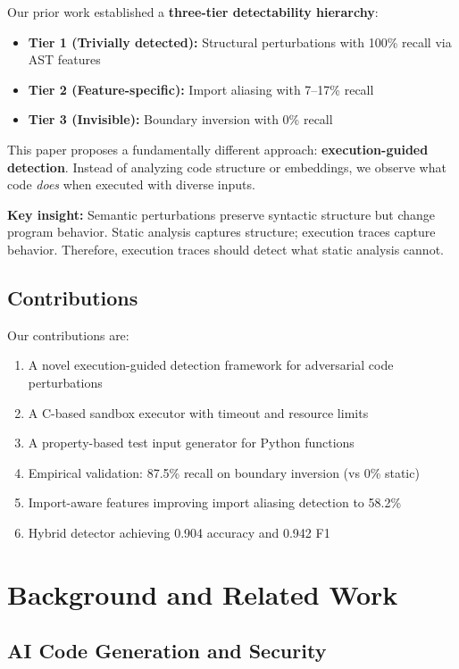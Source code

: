 \documentclass[conference]{IEEEtran}
\begin{document}
Our prior work established a \textbf{three-tier detectability hierarchy}:
\begin{itemize}
    \item \textbf{Tier 1 (Trivially detected):} Structural perturbations with 100\% recall via AST features
    \item \textbf{Tier 2 (Feature-specific):} Import aliasing with 7--17\% recall
    \item \textbf{Tier 3 (Invisible):} Boundary inversion with 0\% recall
\end{itemize}

This paper proposes a fundamentally different approach: \textbf{execution-guided detection}. Instead of analyzing code structure or embeddings, we observe what code \textit{does} when executed with diverse inputs.

\textbf{Key insight:} Semantic perturbations preserve syntactic structure but change program behavior. Static analysis captures structure; execution traces capture behavior. Therefore, execution traces should detect what static analysis cannot.

\subsection{Contributions}

Our contributions are:
\begin{enumerate}
    \item A novel execution-guided detection framework for adversarial code perturbations
    \item A C-based sandbox executor with timeout and resource limits
    \item A property-based test input generator for Python functions
    \item Empirical validation: 87.5\% recall on boundary inversion (vs 0\% static)
    \item Import-aware features improving import aliasing detection to 58.2\%
    \item Hybrid detector achieving 0.904 accuracy and 0.942 F1
\end{enumerate}

\section{Background and Related Work}
\label{sec:related}

\subsection{AI Code Generation and Security}
\end{document}
